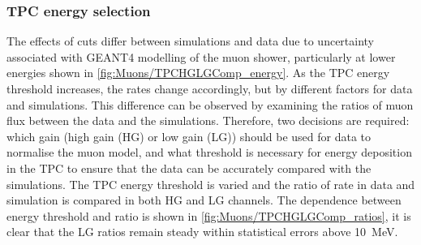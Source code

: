 \subsubsection{TPC energy selection}\label{sec:Muons/TPCEnergySelection}
The effects of cuts differ between simulations and data due to uncertainty associated with GEANT4 modelling of the muon shower, particularly at lower energies shown in \autoref{fig:Muons/TPCHGLGComp_energy}. As the TPC energy threshold increases, the rates change accordingly, but by different factors for data and simulations. This difference can be observed by examining the ratios of muon flux between the data and the simulations. Therefore, two decisions are required: which gain (high gain (HG) or low gain (LG)) should be used for data to normalise the muon model, and what threshold is necessary for energy deposition in the TPC to ensure that the data can be accurately compared with the simulations. The TPC energy threshold is varied and the ratio of rate in data and simulation is compared in both HG and LG channels. The dependence between energy threshold and ratio is shown in \autoref{fig:Muons/TPCHGLGComp_ratios}, it is clear that the LG ratios remain steady within statistical errors above 10~MeV.
